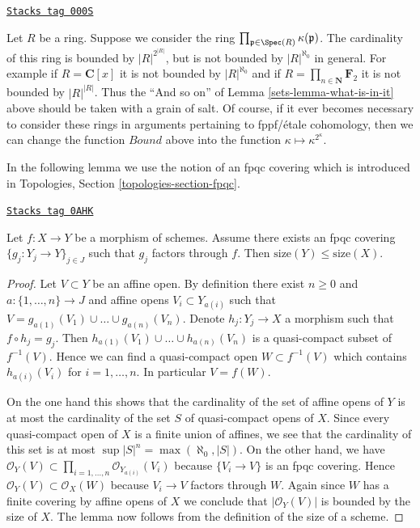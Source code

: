 \begin{remark}
\label{sets-remark-what-is-not-in-it}
\href{https://stacks.math.columbia.edu/tag/000S}{\texttt{Stacks tag 000S}}

Let $R$ be a ring. Suppose we consider the ring
$\prod_{\mathfrak p \in \Spec(R)} \kappa(\mathfrak p)$.
The cardinality of this ring is bounded by $|R|^{2^{|R|}}$,
but is not bounded by $|R|^{\aleph_0}$ in general.
For example if $R = \mathbf{C}[x]$ it is not bounded by
$|R|^{\aleph_0}$ and if $R = \prod_{n \in \mathbf{N}} \mathbf{F}_2$
it is not bounded by $|R|^{|R|}$.
Thus the ``And so on'' of Lemma \ref{sets-lemma-what-is-in-it} above
should be taken with a grain of salt. Of course, if it ever becomes
necessary to consider these rings in arguments pertaining to
fppf/\'etale cohomology, then we can change the function
$Bound$ above into the function $\kappa \mapsto \kappa^{2^\kappa}$.
\end{remark}

In the following lemma we use the notion of an fpqc covering which
is introduced in Topologies, Section \ref{topologies-section-fpqc}.

\begin{lemma}
\label{sets-lemma-bound-by-covering}
\href{https://stacks.math.columbia.edu/tag/0AHK}{\texttt{Stacks tag 0AHK}}

Let $f : X \to Y$ be a morphism of schemes. Assume there exists an
fpqc covering $\{g_j : Y_j \to Y\}_{j \in J}$ such that $g_j$ factors
through $f$. Then $\text{size}(Y) \leq \text{size}(X)$.
\end{lemma}

\begin{proof}
Let $V \subset Y$ be an affine open. By definition there exist
$n \geq 0$ and $a : \{1, \ldots, n\} \to J$ and affine opens
$V_i \subset Y_{a(i)}$ such that
$V = g_{a(1)}(V_1) \cup \ldots \cup g_{a(n)}(V_n)$.
Denote $h_j : Y_j \to X$ a morphism such that $f \circ h_j = g_j$.
Then $h_{a(1)}(V_1) \cup \ldots \cup h_{a(n)}(V_n)$ is
a quasi-compact subset of $f^{-1}(V)$. Hence we can find a
quasi-compact open $W \subset f^{-1}(V)$ which contains
$h_{a(i)}(V_i)$ for $i = 1, \ldots, n$.
In particular $V = f(W)$.

\medskip\noindent
On the one hand this shows that the cardinality of the set of
affine opens of $Y$ is at most the cardinality of the set $S$ of
quasi-compact opens of $X$. Since every quasi-compact open of
$X$ is a finite union of affines, we see that the cardinality
of this set is at most $\sup |S|^n = \max(\aleph_0, |S|)$.
On the other hand, we have
$\mathcal{O}_Y(V) \subset \prod_{i = 1, \ldots, n} \mathcal{O}_{Y_{a(i)}}(V_i)$
because $\{V_i \to V\}$ is an fpqc covering. Hence
$\mathcal{O}_Y(V) \subset \mathcal{O}_X(W)$ because $V_i \to V$
factors through $W$. Again since $W$ has a finite covering by
affine opens of $X$ we conclude that $|\mathcal{O}_Y(V)|$
is bounded by the size of $X$. The lemma now follows
from the definition of the size of a scheme.
\end{proof}

